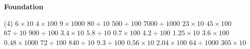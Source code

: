\documentclass[17pt,a4paper,landscape]{extarticle}
\begin{document}
\sffamily
\boldmath

\boldmath

\boldmath

\boldmath

\vspace*{0.4em}
{\LARGE \textbf{Foundation}}
\begin{tasks}(4)
\task \mbox{$6 \times 10$}
\task \mbox{$4 \times 100$}
\task \mbox{$9 \times 1000$}
\task \mbox{$80 \div 10$}
\task \mbox{$500 \div 100$}
\task \mbox{$7000 \div 1000$}
\task \mbox{$23 \times 10$}
\task \mbox{$45 \times 100$}
\task \mbox{$67 \div 10$}
\task \mbox{$900 \div 100$}
\task \mbox{$3.4 \times 10$}
\task \mbox{$5.8 \div 10$}
\task \mbox{$0.7 \times 100$}
\task \mbox{$4.2 \div 100$}
\task \mbox{$1.25 \times 10$}
\task \mbox{$3.6 \times 100$}
\task \mbox{$0.48 \times 1000$}
\task \mbox{$72 \div 100$}
\task \mbox{$840 \div 10$}
\task \mbox{$9.3 \div 100$}
\task \mbox{$0.56 \times 10$}
\task \mbox{$2.04 \times 100$}
\task \mbox{$64 \div 1000$}
\task \mbox{$305 \times 10$}
\end{tasks}
\end{document}
